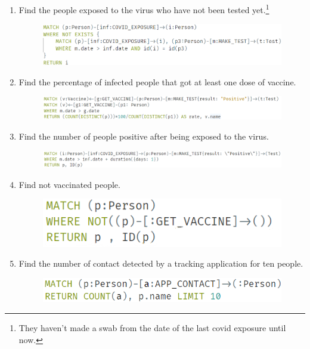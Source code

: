 \begin{enumerate}[leftmargin=*,label=\textbf{\thesection.\arabic*}]
\begin{figure}[!htb]
    \end{figure}
\newpage
    \item Find the people exposed to the virus who have not been tested yet.\footnote{They haven't made a swab from the date of the last covid exposure until now.}
    \begin{figure}[!htb]
        \centering
        \includegraphics[width=\textwidth]{images/exposed_not_tested.png}
    \end{figure} 
    \item Find the percentage of infected people that got at least one dose of vaccine.
    \begin{figure}[h]  
        \centering
        \includegraphics[width=\textwidth]{images/positive_after_vaccine.png}
    \end{figure}
    \item Find the number of people positive after being exposed to the virus.
    \begin{figure}[h]  
        \centering
        \includegraphics[width=\textwidth]{images/positive_after_exposure.png}
    \end{figure}
    \item Find not vaccinated people.
    \begin{figure}[!h]  
        \includegraphics[scale = 0.65]{images/not_vaccinated.png}
    \end{figure}
    \item Find the number of contact detected by a tracking application for ten people.
    \begin{figure}[!h]  
        \includegraphics[scale = 0.65]{images/appcontacts_for_10_people.png}

\end{figure}
\end{enumerate}
